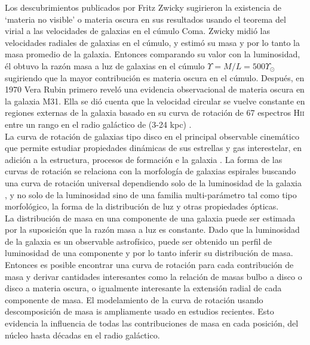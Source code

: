 Los descubrimientos publicados por Fritz Zwicky \cite{Z33, Z37} sugirieron la existencia de `materia no visible' o materia oscura en sus resultados usando el teorema del virial a las velocidades de galaxias en el cúmulo Coma. Zwicky midió las velocidades radiales de galaxias en el cúmulo, y estimó su masa y por lo tanto la masa promedio de la galaxia. Entonces comparando su valor con la luminosidad, él obtuvo la razón masa a luz de galaxias en el cúmulo $\Upsilon = M/L = 500 \Upsilon_\odot$ sugiriendo que la mayor contribución es materia oscura en el cúmulo. Después, en 1970 Vera Rubin primero reveló una evidencia observacional de materia oscura en la galaxia M31. Ella se dió cuenta que la velocidad circular se vuelve constante en regiones externas de la galaxia basado en su curva de rotación de 67 espectros  H\textsc{ii}  entre un rango en el radio galáctico de (3-24 kpc) \cite{R70}.\\

La curva de rotación de galaxias tipo disco en el principal observable cinemático que permite estudiar propiedades dinámicas de sus estrellas y gas interestelar, en adición a la estructura, procesos de formación e la galaxia \cite{S01}. La forma de las curvas de rotación se relaciona con la morfología de galaxias espirales \cite{R80} buscando una curva de rotación universal dependiendo solo de la luminosidad de la galaxia \cite{P96}, y no solo de la luminosidad sino de una familia multi-parámetro tal como tipo morfológico, la forma de la distribución de luz y otras propiedades ópticas\cite{N07}.\\

La distribución de masa en una componente de una galaxia puede ser estimada por la suposición que la razón masa a luz es constante. Dado que la luminosidad de la galaxia es un observable astrofísico, puede ser obtenido un perfil de luminosidad de una componente y por lo tanto inferir su distribución de masa. Entonces es posible encontrar una curva de rotación para cada contribución de masa y derivar cantidades interesantes como la relación de masas bulbo a disco o disco a materia oscura, o igualmente interesante la extensión radial de cada componente de masa. El modelamiento de la curva de rotación usando descomposición de masa is ampliamente usado en estudios recientes. Esto evidencia la influencia de todas las contribuciones de masa en cada posición, del núcleo hasta décadas en el radio galáctico.\\


